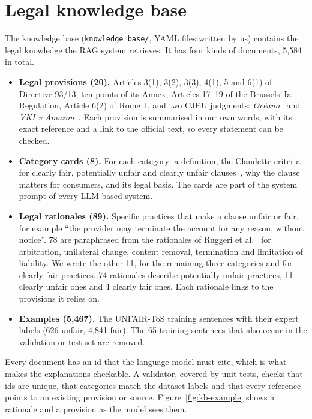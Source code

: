 \section{Legal knowledge base}
\label{sec:kb}

The knowledge base (\texttt{knowledge\_base/}, YAML files written by us) contains the legal knowledge the RAG system retrieves. It has four kinds of documents, 5,584 in total.
\begin{itemize}
  \item \textbf{Legal provisions (20).} Articles 3(1), 3(2), 3(3), 4(1), 5 and 6(1) of Directive 93/13, ten points of its Annex, Articles 17--19 of the Brussels~Ia Regulation, Article 6(2) of Rome~I, and two CJEU judgments: \emph{Oc\'eano}~\citep{cjeu_oceano} and \emph{VKI v Amazon}~\citep{cjeu_amazon}. Each provision is summarised in our own words, with its exact reference and a link to the official text, so every statement can be checked.
  \item \textbf{Category cards (8).} For each category: a definition, the Claudette criteria for clearly fair, potentially unfair and clearly unfair clauses~\citep{lippi2019claudette}, why the clause matters for consumers, and its legal basis. The cards are part of the system prompt of every LLM-based system.
  \item \textbf{Legal rationales (89).} Specific practices that make a clause unfair or fair, for example ``the provider may terminate the account for any reason, without notice''. 78 are paraphrased from the rationales of Ruggeri et al.~\citep{ruggeri2022memory} for arbitration, unilateral change, content removal, termination and limitation of liability. We wrote the other 11, for the remaining three categories and for clearly fair practices. 74 rationales describe potentially unfair practices, 11 clearly unfair ones and 4 clearly fair ones. Each rationale links to the provisions it relies on.
  \item \textbf{Examples (5,467).} The UNFAIR-ToS training sentences with their expert labels (626 unfair, 4,841 fair). The 65 training sentences that also occur in the validation or test set are removed.
\end{itemize}

Every document has an id that the language model must cite, which is what makes the explanations checkable. A validator, covered by unit tests, checks that ids are unique, that categories match the dataset labels and that every reference points to an existing provision or source. Figure~\ref{fig:kb-example} shows a rationale and a provision as the model sees them.

